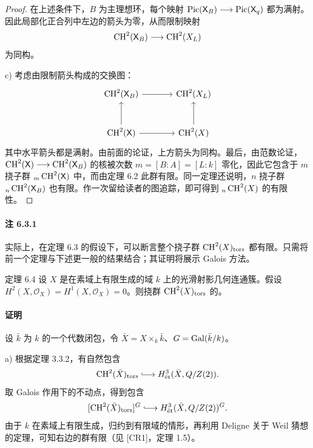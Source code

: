 \begin{proof}
在上述条件下，$B$ 为主理想环，每个映射 $\operatorname{Pic}(\mathsf X_B)\longrightarrow\operatorname{Pic}(\mathsf X_q)$ 都为满射。因此局部化正合列中左边的箭头为零，从而限制映射
\[
\operatorname{CH}^2(\mathsf X_B)\longrightarrow\operatorname{CH}^2(X_L)
\]
为同构。

c) 考虑由限制箭头构成的交换图：
\[
\begin{tikzcd}[ampersand replacement=\&,column sep=large,row sep=large]
\CH^2(\mathsf X_B) \arrow[r] \& \CH^2(X_L)\\
\CH^2(\mathsf X) \arrow[u] \arrow[r] \& \CH^2(X) \arrow[u]
\end{tikzcd}
\]
其中水平箭头都是满射。由前面的论证，上方箭头为同构。最后，由范数论证，$\operatorname{CH}^2(\mathsf X)\longrightarrow\operatorname{CH}^2(\mathsf X_B)$ 的核被次数 $m=[B:A]=[L:k]$ 零化，因此它包含于 $m$ 挠子群 ${}_m\operatorname{CH}^2(\mathsf X)$ 中，而由定理 6.2 此群有限。同一定理还说明，$n$ 挠子群 ${}_n\operatorname{CH}^2(\mathsf X_B)$ 也有限。作一次留给读者的图追踪，即可得到 ${}_n\operatorname{CH}^2(X)$ 的有限性。
\end{proof}
\paragraph{注 6.3.1}
实际上，在定理 6.3 的假设下，可以断言整个挠子群 $\operatorname{CH}^2(X)_{\mathrm{tors}}$ 都有限。只需将前一个定理与下述更一般的结果结合；其证明将展示 Galois 方法。

\begin{statement}{定理 6.4}
设 $X$ 是在素域上有限生成的域 $k$ 上的光滑射影几何连通簇。假设 $H^2(X,\mathcal O_X)=H^1(X,\mathcal O_X)=0$。则挠群 $\operatorname{CH}^2(X)_{\mathrm{tors}}$ 的。
\end{statement}
\paragraph{证明}
设 $\bar k$ 为 $k$ 的一个代数闭包，令 $\bar X=X\times_k\bar k$、$G=\operatorname{Gal}(\bar k/k)$。

a) 根据定理 3.3.2，有自然包含
\[
\CH^2(\bar X)_{\mathrm{tors}}\lhook\joinrel\longrightarrow H^3_{\et}(\bar X,\mathbb Q/\mathbb Z(2)).
\]
取 Galois 作用下的不动点，得到包含
\[
[\CH^2(\bar X)_{\mathrm{tors}}]^G\lhook\joinrel\longrightarrow H^3_{\et}(\bar X,\mathbb Q/\mathbb Z(2))^G.
\]
由于 $k$ 在素域上有限生成，归约到有限域的情形，再利用 Deligne 关于 Weil 猜想的定理，可知右边的群有限（见 [CR1]，定理 1.5）。

